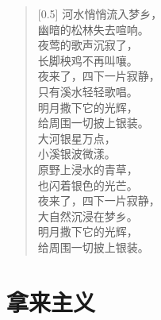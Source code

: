 \documentclass[12pt,UTF-8,openany]{ctexbook}
\begin{document}
\begin{large}
    
    \begin{verse}[0.5\linewidth]
        河水悄悄流入梦乡， \\
        幽暗的松林失去喧响。 \\
        夜莺的歌声沉寂了， \\
        长脚秧鸡不再叫嚷。 \\
        夜来了，四下一片寂静， \\
        只有溪水轻轻歌唱。 \\
        明月撒下它的光辉， \\
        给周围一切披上银装。 \\
        大河银星万点， \\
        小溪银波微漾。 \\
        原野上浸水的青草， \\
        也闪着银色的光芒。 \\
        夜来了，四下一片寂静， \\
        大自然沉浸在梦乡。 \\
        明月撒下它的光辉， \\
        给周围一切披上银装。
    \end{verse}
    
\end{large}



\chapter{拿来主义}
\end{document}
